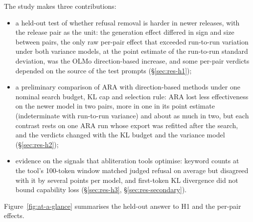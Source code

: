 The study makes three contributions:
\begin{itemize}
\item a held-out test of whether refusal removal is harder in newer releases,
  with the release pair as the unit: the generation effect differed in sign
  and size between pairs, the only raw per-pair effect that exceeded
  run-to-run variation under both variance models, at the point estimate of the
  run-to-run standard deviation, was the OLMo direction-based increase, and
  some per-pair verdicts depended on the source of the test prompts
  (\S\ref{sec:res-h1});
\item a preliminary comparison of ARA with direction-based methods under one
  nominal search budget, KL cap and selection rule: ARA lost less
  effectiveness on the newer model in two pairs, more in one in its point
  estimate (indeterminate with run-to-run variance) and about as much in two,
  but each contrast rests on one ARA run whose export was
  refitted after the search, and the verdicts changed with the KL budget and
  the variance model (\S\ref{sec:res-h2});
\item evidence on the signals that abliteration tools optimise: keyword
  counts at the tool's 100-token window matched judged refusal on average but
  disagreed with it by several points per model, and first-token KL
  divergence did not bound capability loss (\S\ref{sec:res-h3},
  \S\ref{sec:res-secondary}).
\end{itemize}

Figure~\ref{fig:at-a-glance} summarises the held-out answer to H1 and the per-pair effects.

